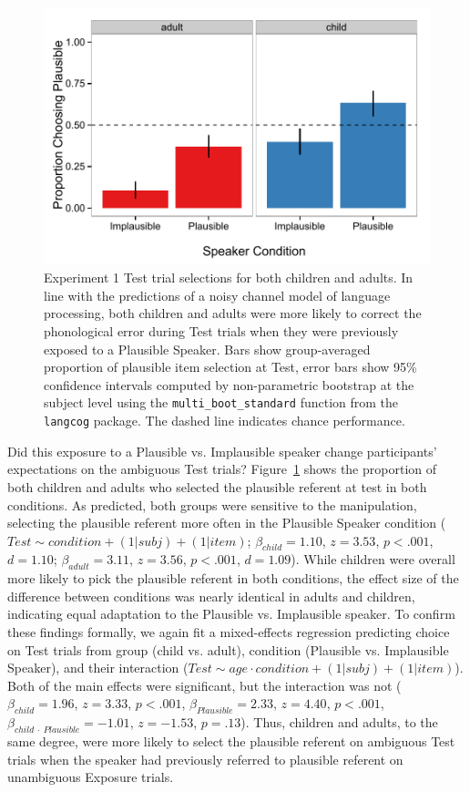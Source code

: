 \documentclass[man,floatsintext]{apa6}
\begin{document}
\begin{figure}[tb]
\centering
     \includegraphics[width=5in]{figures/exp1_results.pdf}
    \caption{Experiment 1 Test trial selections for both children and adults. In line with the predictions of a noisy channel model of language processing, both children and adults were more likely to correct the phonological error during Test trials when they were previously exposed to a Plausible Speaker. Bars show group-averaged proportion of plausible item selection at Test, error bars show 95\% confidence intervals computed by non-parametric bootstrap at the subject level using the {\small \tt{multi\_boot\_standard}} function from the {\small \tt{langcog}} package. The dashed line indicates chance performance.}%
   \label{fig:exp1_results}
\end{figure}

Did this exposure to a Plausible vs. Implausible speaker change participants' expectations on the ambiguous Test trials? Figure~\ref{fig:exp1_results} shows the proportion of both children and adults who selected the plausible referent at test in both conditions. As predicted, both groups were sensitive to the manipulation, selecting the plausible referent more often in the Plausible Speaker condition ($Test \sim condition + (1|subj) + (1|item)$; $\beta_{child} = 1.10$, $z = 3.53$, $p <.001$, $d = 1.10$; $\beta_{adult} = 3.11$, $z = 3.56$, $p <.001$, $d = 1.09$). While children were overall more likely to pick the plausible referent in both conditions, the effect size of the difference between conditions was nearly identical in adults and children, indicating equal adaptation to the Plausible vs. Implausible speaker. To confirm these findings formally, we again fit a mixed-effects regression predicting choice on Test trials from group (child vs. adult), condition (Plausible vs. Implausible Speaker), and their interaction ($Test \sim age \cdot condition + (1|subj) + (1|item)$). Both of the main effects were significant, but the interaction was not ($\beta_{child} = 1.96$,  $z = 3.33$, $p <.001$, $\beta_{Plausible} = 2.33$,  $z = 4.40$, $p <.001$,  $\beta_{child \: \cdot \: Plausible} = -1.01$,  $z = -1.53$, $p = .13$). Thus, children and adults, to the same degree, were more likely to select the plausible referent on ambiguous Test trials when the speaker had previously referred to plausible referent on unambiguous Exposure trials.
\end{document}
